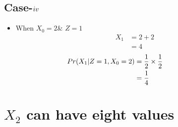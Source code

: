 \documentclass[11pt,a4paper,twocolumn]{article}
\begin{document}
         \subsection{Case-$\romannumeral4$}
         \begin{itemize}
             \item  When $X_{0}=2$\& $Z=1$
             \begin{align*}
         X_{1}&=2+2\\
         &=4
         \end{align*}
         \begin{align*}
        \hspace{-2cm}
          Pr(X_{1}|Z=1,X_{0}=2)&=\frac{1}{2}\times\frac{1}{2}\\
        &=\frac{1}{4}
        \end{align*}
         \end{itemize}
    \section{$X_{2}$ can have eight values}
\end{document}
